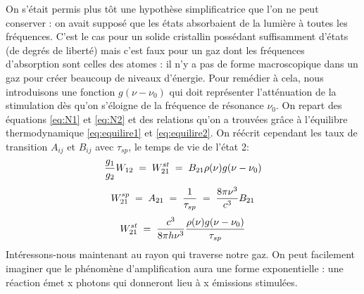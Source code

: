 On s'était permis plus tôt une hypothèse simplificatrice que l'on ne peut conserver : on avait supposé que les états absorbaient de la lumière à toutes les fréquences. C'est le cas pour un solide cristallin possédant suffisamment d'états (de degrés de liberté) mais c'est faux pour un gaz dont les fréquences d'absorption sont celles des atomes : il n'y a pas de forme macroscopique dans un gaz pour créer beaucoup de niveaux d'énergie. Pour remédier à cela, nous introduisons une fonction $g(\nu - \nu_0)$ qui doit représenter l'atténuation de la stimulation dès qu'on s'éloigne de la fréquence de résonance $\nu_0$. On repart des équations \ref{eq:N1} et \ref{eq:N2} et des relations qu'on a trouvées grâce à l'équilibre thermodynamique \ref{eq:equilire1} et \ref{eq:equilire2}. On réécrit cependant les taux de transition $A_{ij}$ et $B_{ij}$ avec $\tau_{sp}$, le temps de vie de l'état 2:
\begin{equation*}
    \dfrac{g_1}{g_2}W_{12} \; = \; W_{21}^{st} \; = \; B_{21} \rho(\nu) g(\nu - \nu_0)
\end{equation*}
\begin{equation*}
    W_{21}^{sp} \; = \; A_{21} \; = \; \dfrac{1}{\tau_{sp}} \; = \; \dfrac{8\pi \nu^3}{c^3}B_{21}
\end{equation*}
\begin{equation*}
    W_{21}^{st} \; = \; \dfrac{c^3}{8\pi h \nu^3}\dfrac{\rho(\nu) g(\nu - \nu_0)}{\tau_{sp}}
\end{equation*}
Intéressons-nous maintenant au rayon qui traverse notre gaz. On peut facilement imaginer que le phénomène d'amplification aura une forme exponentielle : une réaction émet x photons qui donneront lieu à x émissions stimulées.\\

